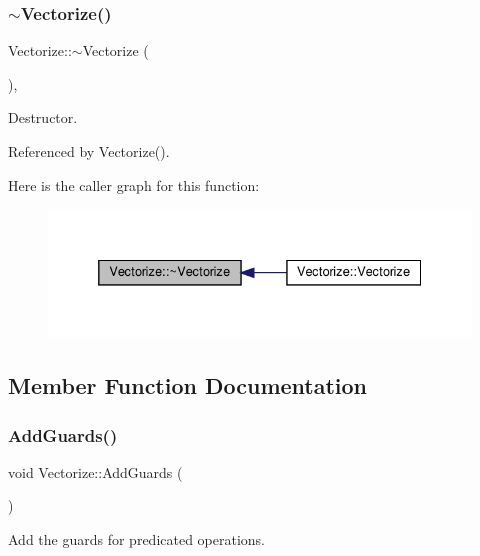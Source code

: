 \subsubsection{\texorpdfstring{$\sim$\+Vectorize()}{~Vectorize()}}
{\footnotesize\ttfamily Vectorize\+::$\sim$\+Vectorize (\begin{DoxyParamCaption}{ }\end{DoxyParamCaption})\hspace{0.3cm}{\ttfamily [override]}, {\ttfamily [default]}}



Destructor. 



Referenced by Vectorize().

Here is the caller graph for this function\+:
\nopagebreak
\begin{figure}[H]
\begin{center}
\leavevmode
\includegraphics[width=332pt]{d5/da5/classVectorize_a404b305e082437652cbc33be7ddb8904_icgraph}
\end{center}
\end{figure}


\subsection{Member Function Documentation}
\mbox{\label{classVectorize_a48aec19b5e26bacfd5cc28103057526a}} 
\subsubsection{\texorpdfstring{Add\+Guards()}{AddGuards()}}
{\footnotesize\ttfamily void Vectorize\+::\+Add\+Guards (\begin{DoxyParamCaption}{ }\end{DoxyParamCaption})\hspace{0.3cm}{\ttfamily [private]}}



Add the guards for predicated operations. 

